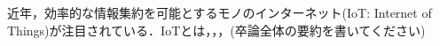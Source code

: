 

\begin{jabstract}
    近年，効率的な情報集約を可能とするモノのインターネット(IoT: Internet of Things)が注目されている．IoTとは，，，(卒論全体の要約を書いてください)

\end{jabstract}
